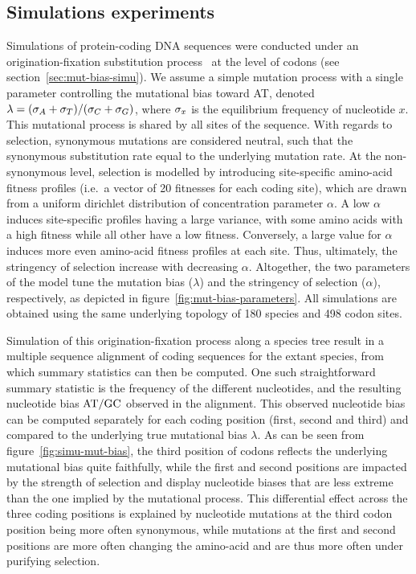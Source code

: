 \documentclass{article}
\begin{document}
\subsection{Simulations experiments}
\label{subsec:simulations-experiments}

Simulations of protein-coding {DNA} sequences were conducted under an origination-fixation {substitution} process~\citep{McCandlish2014} at the level of codons (see section~\ref{sec:mut-bias-simu}).
We assume a simple mutation process with a single parameter controlling the mutational bias toward AT, denoted $\lambda = (\sigma_A+\sigma_T)/(\sigma_C+\sigma_G)$, where $\sigma_x$ is the equilibrium frequency of nucleotide $x$.
This mutational process is shared by all sites of the sequence.
With regards to selection, {synonymous} mutations are considered {neutral}, such that the {synonymous} {substitution} rate equal to the underlying mutation rate.
At the {non-synonymous} level, selection is modelled by introducing site-specific amino-acid fitness profiles (i.e.~a vector of 20 fitnesses for each coding site), which are drawn from a uniform dirichlet distribution of concentration parameter $\alpha$.
A low $\alpha$ induces site-specific profiles having a large variance, with some amino acids with a high fitness while all other have a low fitness.
Conversely, a large value for $\alpha$ induces more even amino-acid fitness profiles at each site.
Thus, ultimately, the stringency of selection increase with decreasing $\alpha$.
Altogether, the two parameters of the model tune the mutation bias ($\lambda$) and the stringency of selection ($\alpha$), respectively, as depicted in figure~\ref{fig:mut-bias-parameters}.
All simulations are obtained using the same underlying topology of 180 species and 498 codon sites.

Simulation of this origination-fixation process along a species tree result in a multiple sequence alignment of coding sequences for the extant species, from which summary statistics can then be computed.
One such straightforward summary statistic is the frequency of the different nucleotides, and the resulting nucleotide bias $\text{AT/GC}$ observed in the alignment.
This observed nucleotide bias can be computed separately for each coding position (first, second and third) and compared to the underlying true mutational bias $\lambda$.
As can be seen from figure~\ref{fig:simu-mut-bias}, the third position of codons reflects the underlying mutational bias quite faithfully, while the first and second positions are impacted by the strength of selection and display nucleotide biases that are less extreme than the one implied by the mutational process.
This differential effect across the three coding positions is explained by nucleotide mutations at the third codon position being more often {synonymous}, while mutations at the first and second positions are more often changing the amino-acid and are thus more often under purifying selection.
\end{document}
